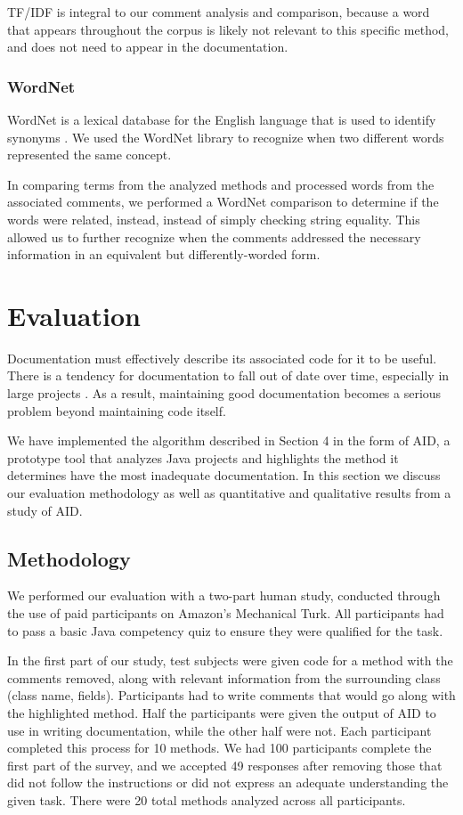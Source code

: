 \documentclass[preprint]{sigplanconf}
\begin{document}
TF/IDF is integral to our comment analysis and comparison, because a word that appears throughout the corpus is likely not relevant to this specific method, and does not need to appear in the documentation.

\subsubsection{WordNet}
WordNet is a lexical database for the English language that is used to identify synonyms \cite{wordnet}. We used the WordNet library to recognize when two different words represented the same concept.

In comparing terms from the analyzed methods and processed words from the associated comments, we performed a WordNet comparison to determine if the words were related, instead, instead of simply checking string equality. This allowed us to further recognize when the comments addressed the necessary information in an equivalent but differently-worded form.

\section{Evaluation}
Documentation must effectively describe its associated code for it to be useful. There is a tendency for documentation to fall out of date over time, especially in large projects \cite{forward}. As a result, maintaining good documentation becomes a serious problem beyond maintaining code itself.

We have implemented the algorithm described in Section 4 in the form of AID, a prototype tool that analyzes Java projects and highlights the method it determines have the most inadequate documentation. In this section we discuss our evaluation methodology as well as quantitative and qualitative results from a study of AID.

\subsection{Methodology}
We performed our evaluation with a two-part human study, conducted through the use of paid participants on Amazon's Mechanical Turk. All participants had to pass a basic Java competency quiz to ensure they were qualified for the task.

In the first part of our study, test subjects were given code for a method with the comments removed, along with relevant information from the surrounding class (class name, fields). Participants had to write comments that would go along with the highlighted method. Half the participants were given the output of AID to use in writing documentation, while the other half were not. Each participant completed this process for 10 methods. We had 100 participants complete the first part of the  survey, and we accepted 49 responses after removing those that did not follow the instructions or did not express an adequate understanding the given task. There were 20 total methods analyzed across all participants.
\end{document}
